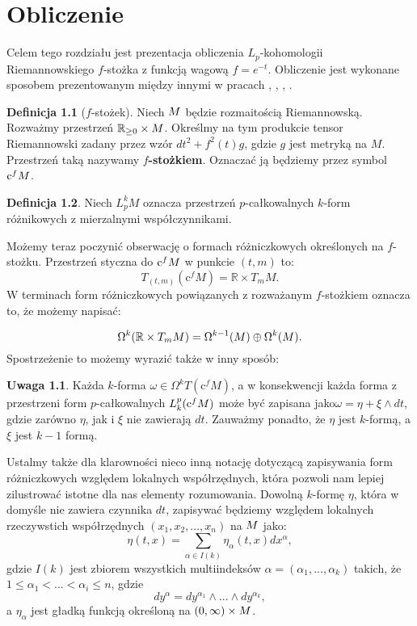 \documentclass[licencjacka]{pracamgr}
\theoremstyle{definition}
\newtheorem{definition}{Definicja}[section]
\theoremstyle{definition}
\newtheorem{remark}{Uwaga}[section]
\theoremstyle{plain}
\theoremstyle{plain}
\theoremstyle{plain}
\def\cfm{\ensuremath\mathrm{c}^fM}
\def\M{\ensuremath M}
\begin{document}
\chapter{Obliczenie}

Celem tego rozdziału jest prezentacja obliczenia 
$L_p$-kohomologii Riemannowskiego $f$-stożka z funkcją wagową $f = e^{-t}$.
Obliczenie jest wykonane sposobem prezentowanym między innymi w
pracach \cite{cheeger}, \cite{youssin}, \cite{kirwan}, \cite{weber}.

\begin{definition}[$f$-stożek]
    Niech $\M$ będzie rozmaitością Riemannowską. Rozważmy przestrzeń
    $\mathbb{R}_{\geq 0} \times \M$. Określmy na tym produkcie tensor
    Riemannowski zadany przez wzór $dt^2 + f^{2}(t)g $, gdzie $g$ jest
    metryką na $M$.  Przestrzeń taką nazywamy \textbf{$f$-stożkiem}.
    Oznaczać ją będziemy przez symbol $\cfm$.
\end{definition}

\begin{definition}
  Niech $L_p^k M$ oznacza przestrzeń $p$-całkowalnych 
  $k$-form różnikowych z mierzalnymi  współczynnikami.
\end{definition}



Możemy teraz poczynić obserwację o formach różniczkowych określonych na 
$f$-stożku. Przestrzeń styczna do $\cfm$ w punkcie $(t, m)$ to:
\[
    T_{(t, m)} (\mathrm{c}^f M) = \mathbb{R} \times T_m M.
\]
W terminach form różniczkowych powiązanych z rozważanym $f$-stożkiem oznacza to, 
że możemy napisać:

\[
\Omega^k(\mathbb{R} \times T_m \M) = 
\Omega^{k-1}(\M)  \oplus \Omega^k(\M).
\]
Spostrzeżenie to możemy wyrazić także w inny sposób: 

\begin{remark}
Każda $k$-forma $\omega \in \Omega^k T(\mathrm{c}^f M)$, 
a w konsekwencji każda forma z przestrzeni form $p$-całkowalnych  $L_k^p
(\cfm)$ może być zapisana jako$\omega = \eta + \xi \wedge dt$,
gdzie zarówno $\eta$, jak i  $\xi$ nie zawierają $dt$.  Zauważmy ponadto,
że $\eta$ jest $k$-formą, a $\xi$ jest $k-1$ formą. \\
\end{remark}

Ustalmy także dla klarowności nieco inną notację dotyczącą zapisywania
form różniczkowych względem lokalnych współrzędnych, która pozwoli nam 
lepiej zilustrować istotne dla nas elementy rozumowania. Dowolną $k$-formę $\eta$,
która w domyśle nie zawiera czynnika $dt$, zapisywać będziemy względem
lokalnych rzeczywstich współrzędnych
$(x_1, x_2, ... , x_n)$ na $\M$ jako:
\[
    \eta(t, x) = \sum_{\alpha \in I(k)} \eta_\alpha (t, x) dx^\alpha,
\]
gdzie $I(k)$ jest zbiorem wszystkich multiindeksów $\alpha = (\alpha_1, ...,
\alpha_k)$ takich, że $1 \leq \alpha_1 < ... < \alpha_i \leq n$, gdzie
\begin{equation}\label{notacja}
    dy^\alpha = dy^{\alpha_1} \wedge ... \wedge dy^{\alpha_k},
\end{equation}
a $\eta_\alpha$ jest gładką funkcją określoną na $(0, \infty) \times \M$. \\
\end{document}
